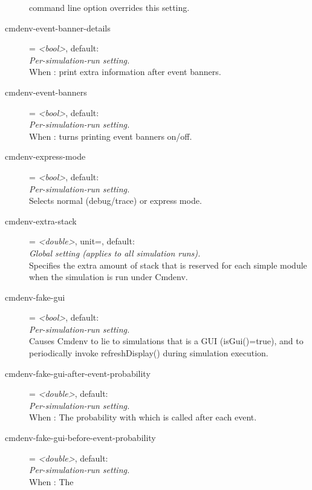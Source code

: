 \begin{description}
     command line option overrides this setting.
\item[cmdenv-event-banner-details] = \textit{<bool>}, default: \\
    \textit{Per-simulation-run setting.}\\
    When
    :
    print extra information after event banners.
\item[cmdenv-event-banners] = \textit{<bool>}, default: \\
    \textit{Per-simulation-run setting.}\\
    When
    :
    turns printing event banners on/off.
\item[cmdenv-express-mode] = \textit{<bool>}, default: \\
    \textit{Per-simulation-run setting.}\\
    Selects normal (debug/trace) or express mode.
\item[cmdenv-extra-stack] = \textit{<double>}, unit=, default: \\
    \textit{Global setting (applies to all simulation runs).}\\
    Specifies the extra amount of stack that is reserved for each
     simple module when the simulation is run under Cmdenv.
\item[cmdenv-fake-gui] = \textit{<bool>}, default: \\
    \textit{Per-simulation-run setting.}\\
    Causes Cmdenv to lie to simulations that is a GUI (isGui()=true), and to
    periodically invoke refreshDisplay() during simulation execution.
\item[cmdenv-fake-gui-after-event-probability] = \textit{<double>}, default: \\
    \textit{Per-simulation-run setting.}\\
    When : The
    probability with which  is called after each event.
\item[cmdenv-fake-gui-before-event-probability] = \textit{<double>}, default: \\
    \textit{Per-simulation-run setting.}\\
    When : The

\end{description}
